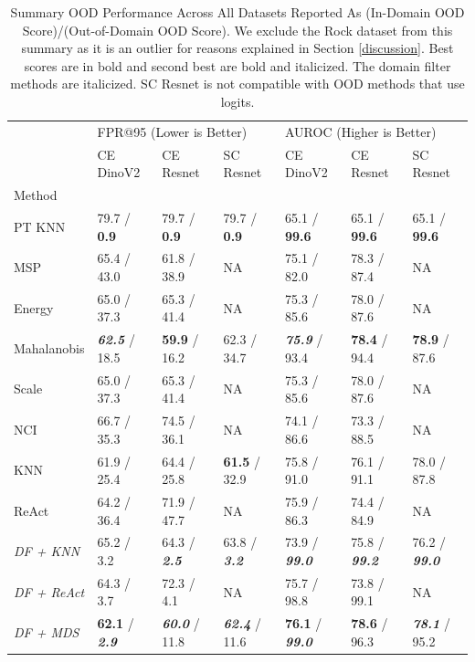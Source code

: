 \documentclass[11pt, oneside]{book}
\theoremstyle{plain}
\theoremstyle{definition}
\theoremstyle{remark}
\begin{document}
\begin{table}[h]
\centering
\caption{Summary OOD Performance Across All Datasets Reported As (In-Domain OOD Score)/(Out-of-Domain OOD Score). We exclude the Rock dataset from this summary as it is an outlier for reasons explained in Section \ref{discussion}. Best scores are in bold and second best are bold and italicized. The domain filter methods are italicized. SC Resnet is not compatible with OOD methods that use logits.}
\label{tab:domain_collapse_results}
\begin{tabular}{lllllll}
\toprule
 & \multicolumn{3}{l}{FPR@95 (Lower is Better)} & \multicolumn{3}{l}{AUROC (Higher is Better)} \\
 & CE DinoV2 & CE Resnet & SC Resnet & CE DinoV2 & CE Resnet & SC Resnet \\
Method &  &  &  &  &  &  \\
\midrule
PT KNN & 79.7 / \textbf{0.9} & 79.7 / \textbf{0.9}  & 79.7 / \textbf{0.9}  & 65.1 / \textbf{99.6} & 65.1 / \textbf{99.6} & 65.1 / \textbf{99.6} \\
MSP & 65.4 / 43.0 & 61.8 / 38.9 & NA & 75.1 / 82.0 & 78.3 / 87.4 & NA \\
Energy & 65.0 / 37.3 & 65.3 / 41.4 & NA & 75.3 / 85.6 & 78.0 / 87.6 & NA \\
Mahalanobis & \textbf{\textit{62.5}} / 18.5 & \textbf{59.9} / 16.2 & 62.3 / 34.7 & \textbf{\textit{75.9}} / 93.4 & \textbf{78.4} / 94.4 & \textbf{78.9} / 87.6 \\
Scale & 65.0 / 37.3 & 65.3 / 41.4 & NA & 75.3 / 85.6 & 78.0 / 87.6 & NA \\
NCI & 66.7 / 35.3 & 74.5 / 36.1 & NA & 74.1 / 86.6 & 73.3 / 88.5 & NA \\
KNN & 61.9 / 25.4 & 64.4 / 25.8 & \textbf{61.5} / 32.9 & 75.8 / 91.0 & 76.1 / 91.1 & 78.0 / 87.8 \\
ReAct & 64.2 / 36.4 & 71.9 / 47.7 & NA & 75.9 / 86.3 & 74.4 / 84.9 & NA \\
\textit{DF + KNN} & 65.2 / 3.2 & 64.3 / \textbf{\textit{2.5}} & 63.8 / \textbf{\textit{3.2}} & 73.9 / \textbf{\textit{99.0}} & 75.8 / \textbf{\textit{99.2}} & 76.2 / \textbf{\textit{99.0}} \\
\textit{DF + ReAct} & 64.3 / 3.7 & 72.3 / 4.1 & NA & 75.7 / 98.8 & 73.8 / 99.1 & NA \\
\textit{DF + MDS} & \textbf{62.1} / \textbf{\textit{2.9}} & \textbf{\textit{60.0}} / 11.8 & \textbf{\textit{62.4}} / 11.6 & \textbf{76.1} / \textbf{\textit{99.0}} & \textbf{78.6} / 96.3 & \textbf{\textit{78.1}} / 95.2 \\
\bottomrule
\end{tabular}
\end{table}
\end{document}
